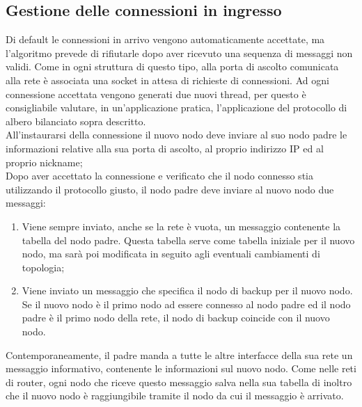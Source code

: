 \documentclass[10pt]{article} %
\begin{document}
\subsection{Gestione delle connessioni in ingresso}
Di default le connessioni in arrivo vengono automaticamente accettate, ma l'algoritmo prevede di rifiutarle dopo aver ricevuto una sequenza di messaggi non validi. Come in ogni struttura di questo tipo, alla porta di ascolto comunicata alla rete è associata una socket in attesa di richieste di connessioni. Ad ogni connessione accettata vengono generati due nuovi thread, per questo è consigliabile valutare, in un'applicazione pratica, l'applicazione del protocollo di albero bilanciato sopra descritto.\\
All'instaurarsi della connessione il nuovo nodo deve inviare al suo nodo padre le informazioni relative alla sua porta di ascolto, al proprio indirizzo IP ed al proprio nickname; \\
Dopo aver accettato la connessione e verificato che il nodo connesso stia utilizzando il protocollo giusto, il nodo padre deve inviare al nuovo nodo due messaggi:
\begin{enumerate}
	\item Viene sempre inviato, anche se la rete è vuota, un messaggio contenente la tabella del nodo padre. Questa tabella serve come tabella iniziale per il nuovo nodo, ma sarà poi modificata in seguito agli eventuali cambiamenti di topologia;
	\item Viene inviato un messaggio che specifica il nodo di backup per il nuovo nodo. Se il nuovo nodo è il primo nodo ad essere connesso al nodo padre ed il nodo padre è il primo nodo della rete, il nodo di backup coincide con il nuovo nodo.
\end{enumerate}
Contemporaneamente, il padre manda a tutte le altre interfacce della sua rete un messaggio informativo, contenente le informazioni sul nuovo nodo. Come nelle reti di router, ogni nodo che riceve questo messaggio salva nella sua tabella di inoltro che il nuovo nodo è raggiungibile tramite il nodo da cui il messaggio è arrivato. 
\end{document}
